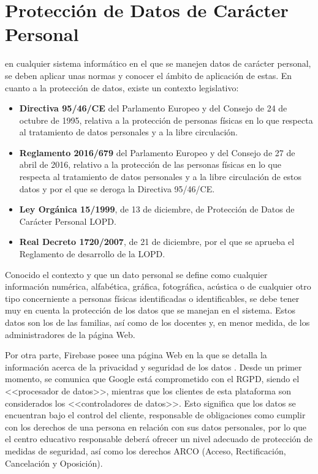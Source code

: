 \chapter{Protección de Datos de Carácter Personal}
\label{chap:lopd}
 en cualquier sistema informático en el que se manejen datos de carácter personal, se deben aplicar unas normas y conocer el ámbito de aplicación de estas.  En cuanto a la protección de datos, existe un contexto legislativo:

\begin{itemize}
	\item \textbf{Directiva 95/46/CE} del Parlamento Europeo y del Consejo de 24 de octubre de 1995, relativa a la protección de personas físicas en lo que respecta al tratamiento de datos personales y a la libre circulación.
	\item \textbf{Reglamento 2016/679} del Parlamento Europeo y del Consejo de 27 de abril de 2016, relativo a la protección de las personas físicas en lo que respecta al tratamiento de datos personales y a la libre circulación de estos datos y por el que se deroga la Directiva 95/46/CE.
	\item \textbf{Ley Orgánica 15/1999}, de 13 de diciembre, de Protección de Datos de Carácter Personal \acf{LOPD}.
	\item \textbf{Real Decreto 1720/2007}, de 21 de diciembre, por el que se aprueba el Reglamento de desarrollo de la \acs{LOPD}.
\end{itemize}

Conocido el contexto y que un dato personal se define como cualquier información numérica, alfabética, gráfica, fotográfica, acústica o de cualquier otro tipo concerniente a personas físicas identificadas o identificables, se debe tener muy en cuenta la protección de los datos que se manejan en el sistema. Estos datos son los de las familias, así como de los docentes y, en menor medida, de los administradores de la página Web.

Por otra parte, Firebase posee una página Web en la que se detalla la información acerca de la privacidad y seguridad de los datos \cite{Firebase2018}. Desde un primer momento, se comunica que Google está comprometido con el \acs{RGPD}, siendo el <<procesador de datos>>, mientras que los clientes de esta plataforma son considerados los <<controladores de datos>>. Esto significa que los datos se encuentran bajo el control del cliente, responsable de obligaciones como cumplir con los derechos de una persona en relación con sus datos personales, por lo que el centro educativo responsable deberá ofrecer un nivel adecuado de protección de medidas de seguridad, así como los derechos ARCO (Acceso, Rectificación, Cancelación y Oposición).